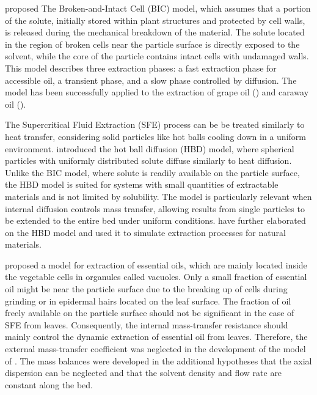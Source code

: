 \documentclass[a4paper,fleqn]{cas-dc}
\begin{document}
\citet{Sovova1994} proposed The Broken-and-Intact Cell (BIC) model, which assumes that a portion of the solute, initially stored within plant structures and protected by cell walls, is released during the mechanical breakdown of the material. The solute located in the region of broken cells near the particle surface is directly exposed to the solvent, while the core of the particle contains intact cells with undamaged walls. This model describes three extraction phases: a fast extraction phase for accessible oil, a transient phase, and a slow phase controlled by diffusion. The model has been successfully applied to the extraction of grape oil (\citet{Sovova1994b}) and caraway oil (\citet{Sovova1994a}).

The Supercritical Fluid Extraction (SFE) process can be be treated similarly to heat transfer, considering solid particles like hot balls cooling down in a uniform environment. \citet{Bartle1990} introduced the hot ball diffusion (HBD) model, where spherical particles with uniformly distributed solute diffuse similarly to heat diffusion. Unlike the BIC model, where solute is readily available on the particle surface, the HBD model is suited for systems with small quantities of extractable materials and is not limited by solubility. The model is particularly relevant when internal diffusion controls mass transfer, allowing results from single particles to be extended to the entire bed under uniform conditions. \citet{Reverchon1993} have further elaborated on the HBD model and used it to simulate extraction processes for natural materials.

\citet{Reverchon1996} proposed a model for extraction of essential oils, which are mainly located inside the vegetable cells in organules called vacuoles. Only a small fraction of essential oil might be near the particle surface due to the breaking up of cells during grinding or in epidermal hairs located on the leaf surface. The fraction of oil freely available on the particle surface should not be significant in the case of SFE from leaves. Consequently, the internal mass-transfer resistance should mainly control the dynamic extraction of essential oil from leaves. Therefore, the external mass-transfer coefficient was neglected in the development of the model of \citet{Reverchon1996}. The mass balances were developed in the additional hypotheses that the axial dispersion can be neglected and that the solvent density and flow rate are constant along the bed.
\end{document}
